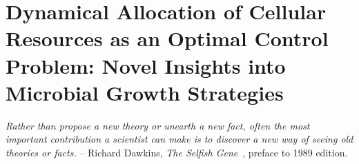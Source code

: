 \chapter{Dynamical Allocation of Cellular Resources as an Optimal Control Problem: Novel Insights into Microbial Growth Strategies }
\label{chap:theory}

\textit{Rather than propose a new theory or unearth a new fact, often the most important contribution a scientist can make is to discover a new way of seeing old theories or facts.} -- Richard Dawkins, \textit{The Selfish Gene}~\cite{dawkins_selfish_1976}, preface to 1989 edition.


